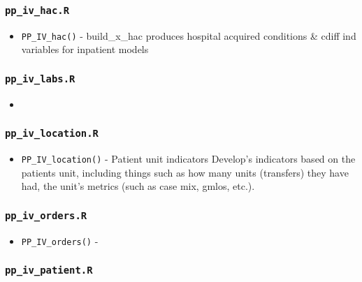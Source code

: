 \documentclass[
]{book}
\providecommand{\tightlist}{%
  \setlength{\itemsep}{0pt}\setlength{\parskip}{0pt}}
\begin{document}
\hypertarget{pp_iv_hac.r}{%
\subsubsection{\texorpdfstring{\texttt{pp\_iv\_hac.R}}{pp\_iv\_hac.R}}\label{pp_iv_hac.r}}

\begin{itemize}
\tightlist
\item
  \texttt{PP\_IV\_hac()} - build\_x\_hac produces hospital acquired conditions \& cdiff ind variables for inpatient models
\end{itemize}

\hypertarget{pp_iv_labs.r}{%
\subsubsection{\texorpdfstring{\texttt{pp\_iv\_labs.R}}{pp\_iv\_labs.R}}\label{pp_iv_labs.r}}

\begin{itemize}
\item
\end{itemize}

\hypertarget{pp_iv_location.r}{%
\subsubsection{\texorpdfstring{\texttt{pp\_iv\_location.R}}{pp\_iv\_location.R}}\label{pp_iv_location.r}}

\begin{itemize}
\tightlist
\item
  \texttt{PP\_IV\_location()} - Patient unit indicators Develop's indicators based on the patients unit, including things such as how many units (transfers) they have had, the unit's metrics (such as case mix, gmlos, etc.).
\end{itemize}

\hypertarget{pp_iv_orders.r}{%
\subsubsection{\texorpdfstring{\texttt{pp\_iv\_orders.R}}{pp\_iv\_orders.R}}\label{pp_iv_orders.r}}

\begin{itemize}
\tightlist
\item
  \texttt{PP\_IV\_orders()} -
\end{itemize}

\hypertarget{pp_iv_patient.r}{%
\subsubsection{\texorpdfstring{\texttt{pp\_iv\_patient.R}}{pp\_iv\_patient.R}}\label{pp_iv_patient.r}}
\end{document}
